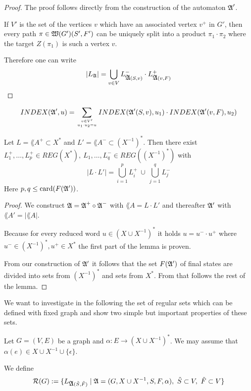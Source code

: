 \begin{proof}
The proof follows directly from the construction of the automaton $\mbox{$\mathfrak{A}$}'$.

If $V'$ is the set of the vertices $v$ which have an associated vertex $v^+$ in
$G'$, then every path $\pi \in \mbox{$\mathfrak{W}(G')$}(S', F')$ can be uniquely split into
a product $\pi_1 \cdot \pi_2$ where the target $Z(\pi_1)$ is such a vertex $v$.

Therefore one can write
\[ |\mbox{$L_{\mathfrak{A}}$}| = \bigcup_{v \in V} L_{\mbox{$\mathfrak{A}$}(S, v)}^- \cdot L_{\mbox{$\mathfrak{A}$}(v, F)}^+
\]
\end{proof}

\begin{corollary}
\[ INDEX(\mbox{$\mathfrak{A}$}', u) = \sum_{v \in V' \atop u_1 \cdot u_2 = u}
INDEX(\mbox{$\mathfrak{A}$}'(S, v), u_1) \cdot INDEX(\mbox{$\mathfrak{A}$}'(v, F), u_2) \]
\end{corollary}

\begin{lemma}
Let $L = \lang{A}^+ \subset X^*$ and $L' = \lang{A}^- \subset (X^{-1})^*$. Then
there exist $L_1^+,\ldots,L_p^+ \in REG(X^*),\ L_1,\ldots,L_q^- \in
REG((X^{-1})^*)$ with
\[ |L \cdot L'| = \bigcup_{i=1}^{p} L_i^+ \ \cup\ \bigcup_{j=1}^{q} L_j^- \]
Here $p, q \leq \mathrm{card}(F(\mbox{$\mathfrak{A'}$}))$.
\end{lemma}

\begin{proof}
We construct $\mbox{$\mathfrak{A}$} = \mbox{$\mathfrak{A}$}^+ \circ \mbox{$\mathfrak{A}$}^-$ with $\lang{A} = L \cdot L'$ and
thereafter $\mbox{$\mathfrak{A'}$}$ with $\lang{A'} = |\lang{A}|$.

Because for every reduced word $u \in (X\cup X^{-1})^*$ it holds $u = u^- \cdot
u^+$ where $u^- \in (X^{-1})^*, u^+ \in X^*$ the first part of the lemma is
proven.

From our construction of $\mbox{$\mathfrak{A'}$}$ it follows that the set $F(\mbox{$\mathfrak{A'}$})$ of final
states are divided into sets from $(X^{-1})^*$ and sets from $X^*$. From that
follows the rest of the lemma.
\end{proof}

We want to investigate in the following the set of regular sets which can be
defined with fixed graph and show two simple but important properties of these
sets.

Let $G = (V, E)$ be a graph and $\alpha : E \to (X \cup X^{-1})^*$. We may
assume that $\alpha(e) \in X \cup X^{-1} \cup \{\epsilon\}$.

We define
\[ \mathcal{R}(G) := \{ L_{\mbox{$\mathfrak{A}$}(\tilde{S},\tilde{F})} \mid \mbox{$\mathfrak{A}$} = (G, X \cup
X^{-1}, S, F, \alpha),\ \tilde{S} \subset V,\ \tilde{F} \subset V \} \]

